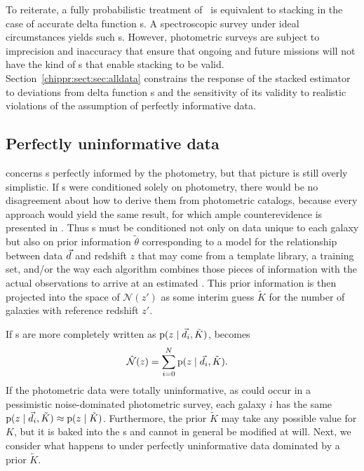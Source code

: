 To reiterate, a fully probabilistic treatment of \Nz\ is equivalent to stacking in the case of accurate delta function \pzpdf s.
A spectroscopic survey under ideal circumstances yields such \pzpdf s.
However, photometric surveys are subject to imprecision and inaccuracy that ensure that ongoing and future missions will not have the kind of \pzpdf s that enable stacking to be valid.
Section~\ref{chippr:sect:sec:alldata} constrains the response of the stacked estimator to deviations from delta function \pzpdf s and the sensitivity of its validity to realistic violations of the assumption of perfectly informative data.

\subsection{Perfectly uninformative data}

 concerns \pzpdf s perfectly informed by the photometry, but that picture is still overly simplistic.
If \pzpdf s were conditioned solely on photometry, there would be no disagreement about how to derive them from photometric catalogs, because every approach would yield the same result, for which ample counterevidence is presented in .
Thus \pzpdf s must be conditioned not only on data unique to each galaxy but also on prior information $\tilde{\theta}$ corresponding to a model for the relationship between data $\vec{d}$ and redshift $z$ that may come from a template library, a training set, and/or the way each algorithm combines those pieces of information with the actual observations to arrive at an estimated \pzpdf.
This prior information is then projected into the space of $\mathcal{N}(z')$ as some interim guess $\tilde{K}$ for the number of galaxies with reference redshift $z'$.

If \pzpdf s are more completely written as ${\mathrm{p}(z \mid \vec{d}_{i}, \tilde{K})}$,  becomes
\begin{align}
\eqlabel{eqn:stackwithprior}
    \hat{\mathcal{N}}(z) &= \sum_{i = 0}^{N} \pr{z \gvn \data_{i}, \tilde{K}} .
\end{align}
If the photometric data were totally uninformative, as could occur in a pessimistic noise-dominated photometric survey, each galaxy $i$ has the same ${\mathrm{p}(z \mid \vec{d}_{i}, \tilde{K}) \approx \mathrm{p}(z \mid \tilde{K})}$.
Furthermore, the prior $\tilde{K}$ may take any possible value for $K$, but it is baked into the \pzpdf s and cannot in general be modified at will.
Next, we consider what happens to  under perfectly uninformative data dominated by a prior $\tilde{K}$.

